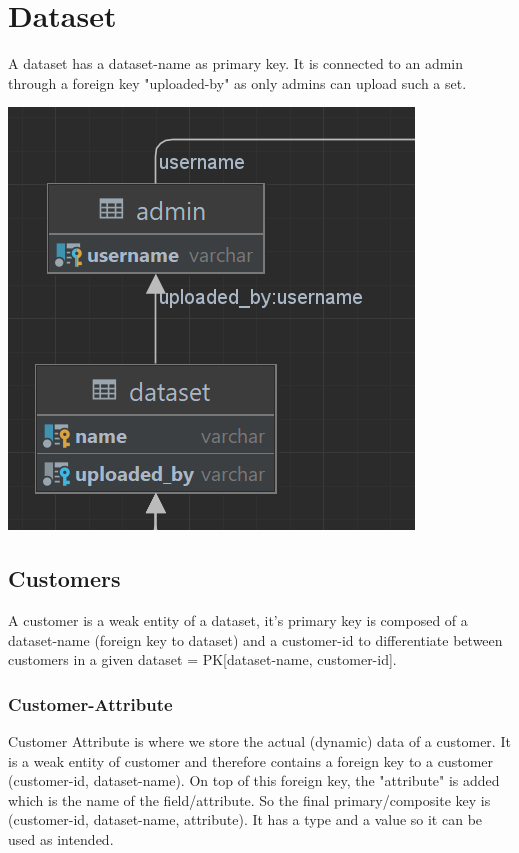 \documentclass[a4paper,12pt]{article}
\begin{document}
	\section{Dataset}
	A dataset has a dataset-name as primary key. It is connected to an admin through a foreign key "uploaded-by" as only admins can upload such a set.
	\begin{center}
		  		\includegraphics[width=\textwidth]{Dataset.png}
	\end{center}
	\pagebreak
	\subsection{Customers}
	A customer is a weak entity of a dataset, it's primary key is composed of a dataset-name (foreign key to dataset) and a customer-id to differentiate between customers in a given dataset = PK[dataset-name, customer-id].
	\subsubsection{Customer-Attribute}	
	Customer Attribute is where we store the actual (dynamic) data of a customer. It is a weak entity of customer and therefore contains a foreign key to a customer (customer-id, dataset-name). On top of this foreign key, the "attribute" is added which is the name of the field/attribute. So the final primary/composite key is (customer-id, dataset-name, attribute). It has a type and a value so it can be used as intended.
	
\end{document}
